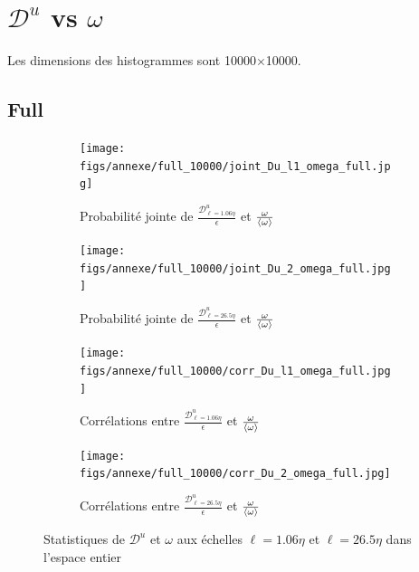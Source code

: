 \documentclass[13pt, a4paper]{extarticle}
\begin{document}
\newpage
\appendix
\appendixpage
\addappheadtotoc

\section{$\mathscr{D}^u$ vs $\omega$}\label{sec:Du}
\noindent Les dimensions des histogrammes sont 10000$\times$10000.
\subsection{Full}
\begin{figure}[H]
  \centering
  \begin{subfigure}[b]{0.48\linewidth}
  \centering
  \texttt{[image: figs/annexe/full\_10000/joint\_Du\_l1\_omega\_full.jpg]}
  \caption{Probabilité jointe de $\frac{\mathscr{D}^u_{\ell=1.06\eta}}{\epsilon}$ et 
  $\frac{\omega}{\left\langle \omega\right\rangle}$}
  \end{subfigure}
  \begin{subfigure}[b]{0.48\linewidth}
    \centering
    \texttt{[image: figs/annexe/full\_10000/joint\_Du\_2\_omega\_full.jpg]}
    \caption{Probabilité jointe de $\frac{\mathscr{D}^u_{\ell=26.5\eta}}{\epsilon}$ et 
    $\frac{\omega}{\left\langle \omega\right\rangle}$}
    \end{subfigure}
    \begin{subfigure}[b]{0.48\linewidth}
      \centering
      \texttt{[image: figs/annexe/full\_10000/corr\_Du\_l1\_omega\_full.jpg]}
      \caption{Corrélations entre $\frac{\mathscr{D}^u_{\ell=1.06\eta}}{\epsilon}$ et 
      $\frac{\omega}{\left\langle \omega\right\rangle}$}
      \end{subfigure}
      \begin{subfigure}[b]{0.48\linewidth}
        \centering
        \texttt{[image: figs/annexe/full\_10000/corr\_Du\_2\_omega\_full.jpg]}
        \caption{Corrélations entre $\frac{\mathscr{D}^u_{\ell=26.5\eta}}{\epsilon}$ et 
        $\frac{\omega}{\left\langle \omega\right\rangle}$}
        \end{subfigure}
  \caption{Statistiques de $\mathscr{D}^u$ et $\omega$ aux échelles $\ell=1.06\eta$ et 
  $\ell=26.5\eta$ dans l'espace entier}
\end{figure}
\end{document}
